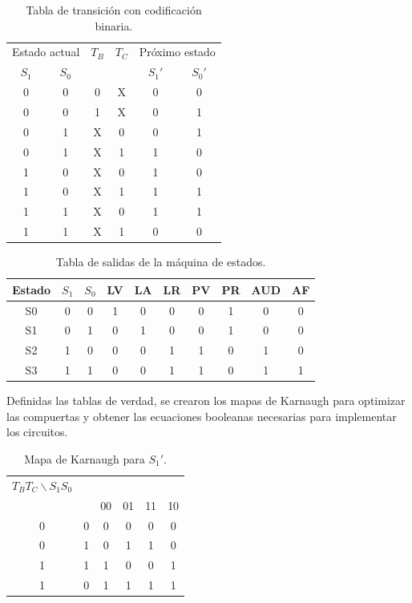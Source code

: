 \documentclass[12pt,onecolumn]{IEEEtran}
\begin{document}
\begin{table}[H]
\centering
\caption{Tabla de transición con codificación binaria.}
\label{tab:transicion_bin}
\begin{tabular}{c c c c c c}
\hline
\multicolumn{2}{c}{Estado actual} & $T_B$ & $T_C$ &
\multicolumn{2}{c}{Próximo estado} \\
$S_1$ & $S_0$ & & & $S_1'$ & $S_0'$ \\
\hline
0 & 0 & 0 & X & 0 & 0 \\
0 & 0 & 1 & X & 0 & 1 \\
0 & 1 & X & 0 & 0 & 1 \\
0 & 1 & X & 1 & 1 & 0 \\
1 & 0 & X & 0 & 1 & 0 \\
1 & 0 & X & 1 & 1 & 1 \\
1 & 1 & X & 0 & 1 & 1 \\
1 & 1 & X & 1 & 0 & 0 \\
\hline
\end{tabular}
\end{table}

\begin{table}[H]
\centering
\caption{Tabla de salidas de la máquina de estados.}
\label{tab:salidas}
\begin{tabular}{c c c c c c c c c c}
\hline
Estado & $S_1$ & $S_0$ & LV & LA & LR & PV & PR & AUD & AF \\
\hline
S0 & 0 & 0 & 1 & 0 & 0 & 0 & 1 & 0 & 0 \\
S1 & 0 & 1 & 0 & 1 & 0 & 0 & 1 & 0 & 0 \\
S2 & 1 & 0 & 0 & 0 & 1 & 1 & 0 & 1 & 0 \\
S3 & 1 & 1 & 0 & 0 & 1 & 1 & 0 & 1 & 1 \\
\hline
\end{tabular}
\end{table}


Definidas las tablas de verdad, se crearon los mapas de Karnaugh
para optimizar las compuertas y obtener las ecuaciones booleanas
necesarias para implementar los circuitos.

\begin{table}[H]
\centering
\caption{Mapa de Karnaugh para $S_1'$.}
\label{tab:kmap_s1}
\begin{tabular}{cc|cccc}
\hline
$T_B T_C \backslash S_1 S_0$\\
 & & 00 & 01 & 11 & 10 \\
\hline
0 & 0 & 0 & 0 & 0 & 0 \\
0 & 1 & 0 & 1 & 1 & 0 \\
1 & 1 & 1 & 0 & 0 & 1 \\
1 & 0 & 1 & 1 & 1 & 1 \\
\hline
\end{tabular}
\end{table}
\end{document}

